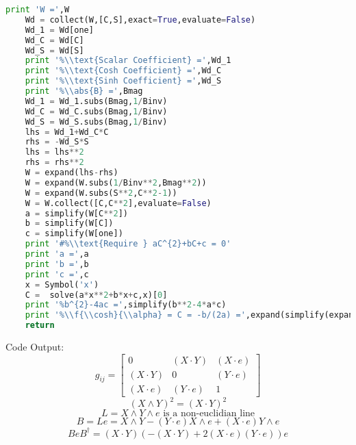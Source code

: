 \documentclass[10pt,fleqn]{report}
\newcommand{\lp}{\left (}
\newcommand{\rp}{\right )}
\newcommand{\abs}[1]{\left |{#1}\right | }
\newcommand{\W}{\wedge}
\newcommand{\f}[2]{{#1}\lp{#2}\rp}
\begin{document}
\begin{lstlisting}[language=Python,showspaces=false,showstringspaces=false,backgroundcolor=\color{gray},frame=single]
    print 'W =',W
    Wd = collect(W,[C,S],exact=True,evaluate=False)
    Wd_1 = Wd[one]
    Wd_C = Wd[C]
    Wd_S = Wd[S]
    print '%\\text{Scalar Coefficient} =',Wd_1
    print '%\\text{Cosh Coefficient} =',Wd_C
    print '%\\text{Sinh Coefficient} =',Wd_S
    print '%\\abs{B} =',Bmag
    Wd_1 = Wd_1.subs(Bmag,1/Binv)
    Wd_C = Wd_C.subs(Bmag,1/Binv)
    Wd_S = Wd_S.subs(Bmag,1/Binv)
    lhs = Wd_1+Wd_C*C
    rhs = -Wd_S*S
    lhs = lhs**2
    rhs = rhs**2
    W = expand(lhs-rhs)
    W = expand(W.subs(1/Binv**2,Bmag**2))
    W = expand(W.subs(S**2,C**2-1))
    W = W.collect([C,C**2],evaluate=False)
    a = simplify(W[C**2])
    b = simplify(W[C])
    c = simplify(W[one])
    print '#%\\text{Require } aC^{2}+bC+c = 0'
    print 'a =',a
    print 'b =',b
    print 'c =',c
    x = Symbol('x')
    C =  solve(a*x**2+b*x+c,x)[0]
    print '%b^{2}-4ac =',simplify(b**2-4*a*c)
    print '%\\f{\\cosh}{\\alpha} = C = -b/(2a) =',expand(simplify(expand(C)))
    return
\end{lstlisting}
Code Output:
\begin{equation*} g_{ij} = \left[\begin{matrix}0 & \left ( X\cdot Y\right )  & \left ( X\cdot e\right ) \\\left ( X\cdot Y\right )  & 0 & \left ( Y\cdot e\right ) \\\left ( X\cdot e\right )  & \left ( Y\cdot e\right )  & 1\end{matrix}\right] \end{equation*}
\begin{equation*} (X\W Y)^{2} = \left ( X\cdot Y\right ) ^{2} \end{equation*}
\begin{equation*} L = X\W Y\W e \text{ is a non-euclidian line} \end{equation*}
\begin{equation*} B = L e =  X\wedge Y - \left ( Y\cdot e\right )  X\wedge e + \left ( X\cdot e\right )  Y\wedge e \end{equation*}
\begin{equation*} BeB^{\dagger} = \left ( X\cdot Y\right )  \left(- \left ( X\cdot Y\right )  + 2 \left ( X\cdot e\right )  \left ( Y\cdot e\right ) \right) e \end{equation*}
\end{document}
